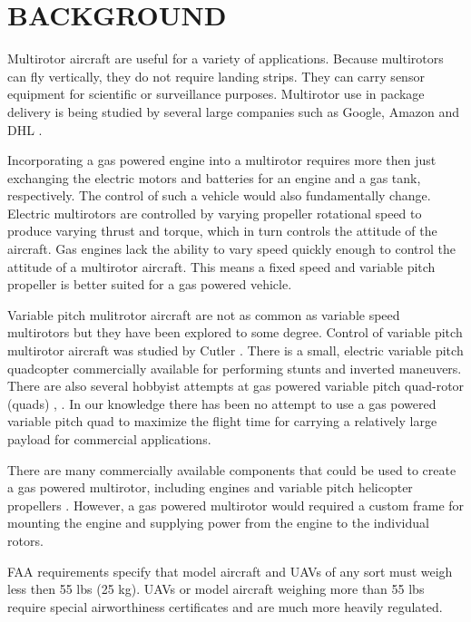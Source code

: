 \documentclass[letterpaper, 10 pt, conference]{ieeeconf}  %
\begin{document}
\section{BACKGROUND}

Multirotor aircraft are useful for a variety of applications.  Because multirotors can fly vertically, they do not require landing strips.  They can carry sensor equipment for scientific or surveillance purposes. Multirotor use in package delivery is being studied by several large companies such as Google, Amazon and DHL \cite{Amazon2014}.   

Incorporating a gas powered engine into a multirotor requires more then just exchanging the electric motors and batteries for an engine and a gas tank, respectively. The control of such a vehicle would also fundamentally change.  Electric multirotors are controlled by varying propeller rotational speed to produce varying thrust and torque, which in turn controls the attitude of the aircraft. Gas engines lack the ability to vary speed quickly enough to control the attitude of a multirotor aircraft. This means a fixed speed and variable pitch propeller is better suited for a gas powered vehicle.

Variable pitch mulitrotor aircraft are not as common as variable speed multirotors but they have been explored to some degree. Control of variable pitch multirotor aircraft was studied by Cutler \cite{Cutler2012}. There is a small, electric variable pitch quadcopter commercially available \cite{stingray2016} for performing stunts and inverted maneuvers.  There are also several hobbyist attempts at gas powered variable pitch quad-rotor (quads) \cite{diy2016}, \cite{hackaday2016}. In our knowledge there has been no attempt to use a gas powered variable pitch quad to maximize the flight time for carrying a relatively large payload for commercial applications. 

There are many commercially available components that could be used to create a gas powered multirotor, including engines \cite{da2016} and variable pitch helicopter propellers \cite{align2016}. However, a gas powered multirotor would required a custom frame for mounting the engine and supplying power from the engine to the individual rotors.

FAA requirements \cite{faa2016} specify that model aircraft and UAVs of any sort must weigh less then 55 lbs (25 kg). UAVs or model aircraft weighing more than 55 lbs require special airworthiness certificates and are much more heavily regulated.
\end{document}

